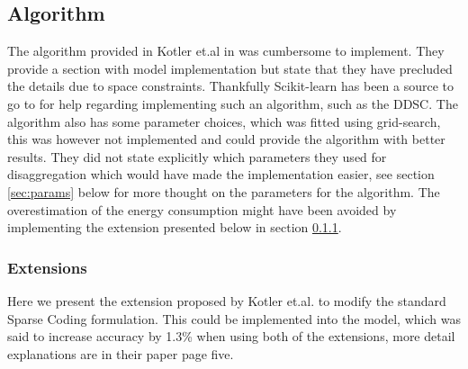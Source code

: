 \subsection{Algorithm}

The algorithm provided in Kotler et.al in \cite{DDSC} was cumbersome to implement. They provide a section with model implementation but state that they have precluded the details due to space constraints. Thankfully Scikit-learn \cite{scikit} has been a source to go to for help regarding implementing such an algorithm, such as the DDSC. The algorithm also has some parameter choices, which was fitted using grid-search, this was however not implemented and could provide the algorithm with better results. They did not state explicitly which parameters they used for disaggregation which would have made the implementation easier, see section \ref{sec:params} below for more thought on the parameters for the algorithm. The overestimation of the energy consumption might have been avoided by implementing the extension presented below in section \ref{sec:extensions}.

\subsubsection{Extensions}
\label{sec:extensions}
Here we present the extension proposed by Kotler et.al. \cite{DDSC} to modify the standard Sparse Coding formulation. This could be implemented into the model, which was said to increase accuracy by 1.3\% when using both of the extensions, more detail explanations are in their paper \cite{DDSC} page five.

